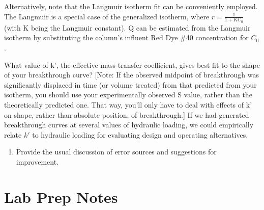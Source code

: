 \documentclass[letterpaper,10pt,english]{sphinxmanual}
\begin{document}
Alternatively, note that the Langmuir isotherm fit can be conveniently employed. The Langmuir is a special case of the generalized isotherm, where \(r=\frac{1}{1+KC_{0} }\) (with K being the Langmuir constant). Q can be estimated from the Langmuir isotherm by substituting the column’s influent Red Dye \#40 concentration for \(C_0\).

What value of k’, the effective mass-transfer coefficient, gives best fit to the shape of your breakthrough curve? {[}Note: If the observed midpoint of breakthrough was significantly displaced in time (or volume treated) from that predicted from your isotherm, you should use your experimentally observed S value, rather than the theoretically predicted one. That way, you’ll only have to deal with effects of k’ on shape, rather than absolute position, of breakthrough.{]} If we had generated breakthrough curves at several values of hydraulic loading, we could empirically relate \(k'\) to hydraulic loading for evaluating design and operating alternatives.
\begin{enumerate}
\item {} 
Provide the usual discussion of error sources and suggestions for improvement.

\end{enumerate}


\section{Lab Prep Notes}
\label{\detokenize{Adsorption/Adsorption:lab-prep-notes}}\label{\detokenize{Adsorption/Adsorption:heading-adsorption-lab-prep-notes}}
\end{document}
